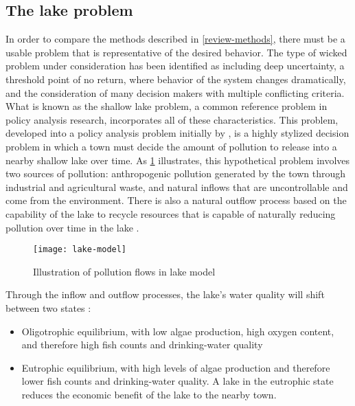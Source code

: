     \subsection{The lake problem}
    In order to compare the methods described in \cref{review-methods}, there must be a usable problem that is representative of the desired behavior. The type of wicked problem under consideration has been identified as including deep uncertainty, a threshold point of no return, where behavior of the system changes dramatically, and the consideration of many decision makers with multiple conflicting criteria. What is known as the shallow lake problem, a common reference problem in policy analysis research, incorporates all of these characteristics. This problem, developed into a policy analysis problem initially by \citep{Carpenter1999}, is a highly stylized decision problem in which a town must decide the amount of pollution to release into a nearby shallow lake over time. As \cref{fig:lake-model} illustrates, this hypothetical problem involves two sources of pollution: anthropogenic pollution generated by the town through industrial and agricultural waste, and natural inflows that are uncontrollable and come from the environment. There is also a natural outflow process based on the capability of the lake to recycle resources that is capable of naturally reducing pollution over time in the lake \citep{Hadka2015}. 

    \begin{figure}[ht]
        \centering
        \captionsetup{justification=centering}
        
        \texttt{[image: lake-model]}
        \caption{Illustration of pollution flows in lake model}
        \label{fig:lake-model}
    \end{figure}
    
    Through the inflow and outflow processes, the lake's water quality will shift between two states \citep{Carpenter1999}: 

    \begin{itemize}
        \item Oligotrophic equilibrium, with low algae production, high oxygen content, and therefore high fish counts and drinking-water quality
        \item Eutrophic equilibrium, with high levels of algae production and therefore lower fish counts and drinking-water quality. A lake in the eutrophic state reduces the economic benefit of the lake to the nearby town. 
    \end{itemize}


